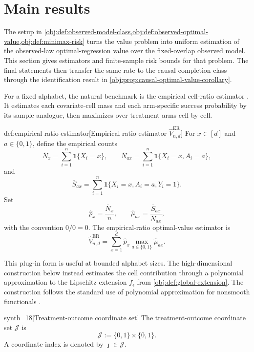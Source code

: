 \section{Main results}

The setup in \cref{obj:def:observed-model-class,obj:def:observed-optimal-value,obj:def:minimax-risk} turns the value problem into uniform estimation of the observed-law optimal-regression value over the fixed-overlap observed model. This section gives estimators and finite-sample risk bounds for that problem. The final statements then transfer the same rate to the causal completion class through the identification result in \cref{obj:prop:causal-optimal-value-corollary}.

For a fixed alphabet, the natural benchmark is the empirical cell-ratio estimator . It estimates each covariate-cell mass and each arm-specific success probability by its sample analogue, then maximizes over treatment arms cell by cell.

\begin{definitionv}{def:empirical-ratio-estimator}[Empirical-ratio estimator \(\widehat V_{n,d}^{\mathrm{ER}}\)]
For \(x\in[d]\) and \(a\in\{0,1\}\), define the empirical counts
\[
\overline N_x
=
\sum_{i=1}^n \mathbf 1\{X_i=x\},
\qquad
\overline N_{ax}
=
\sum_{i=1}^n \mathbf 1\{X_i=x,A_i=a\},
\]
and
\[
\overline S_{ax}
=
\sum_{i=1}^n \mathbf 1\{X_i=x,A_i=a,Y_i=1\}.
\]
Set
\[
\widehat p_x=\frac{\overline N_x}{n},
\qquad
\widehat\mu_{ax}=\frac{\overline S_{ax}}{\overline N_{ax}},
\]
with the convention \(0/0=0\). The empirical-ratio optimal-value estimator is
\[
\widehat V_{n,d}^{\mathrm{ER}}
=
\sum_{x=1}^d \widehat p_x \max_{a\in\{0,1\}}\widehat\mu_{ax}.
\]
\end{definitionv}

This plug-in form is useful at bounded alphabet sizes. The high-dimensional construction below instead estimates the cell contribution through a polynomial approximation to the Lipschitz extension \(\bar f_\epsilon\) from \cref{obj:def:global-extension}. The construction follows the standard use of polynomial approximation for nonsmooth functionals \citep{DeVore1993,JiaoVenkatHanWeissman2015Functionals}.

\begin{definitionv}{synth_18}[Treatment-outcome coordinate set]
The treatment-outcome coordinate set \(\mathcal J\) is
\[
\mathcal J:=\{0,1\}\times\{0,1\}.
\]
A coordinate index is denoted by \(\jmath\in\mathcal J\).
\end{definitionv}

